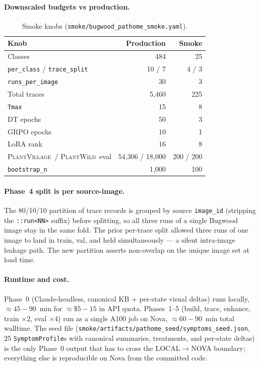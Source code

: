 \documentclass[11pt,twocolumn]{article}
\newcommand{\pv}{\textsc{PlantVillage}\xspace}
\newcommand{\pw}{\textsc{PlantWild}\xspace}
\begin{document}
\paragraph{Downscaled budgets vs production.}
\begin{table}[H]\centering\small
\begin{tabular}{l r r}
\toprule
\textbf{Knob} & \textbf{Production} & \textbf{Smoke} \\
\midrule
Classes & 484 & 25 \\
\texttt{per\_class} / \texttt{trace\_split} & 10 / 7 & 4 / 3 \\
\texttt{runs\_per\_image} & 30 & 3 \\
Total traces & 5{,}460 & 225 \\
\texttt{Tmax} & 15 & 8 \\
DT epochs & 50 & 3 \\
GRPO epochs & 10 & 1 \\
LoRA rank & 16 & 8 \\
\pv\ / \pw\ eval & 54{,}306 / 18{,}000 & 200 / 200 \\
\texttt{bootstrap\_n} & 1{,}000 & 100 \\
\bottomrule
\end{tabular}
\caption{Smoke knobs (\texttt{smoke/bugwood\_pathome\_smoke.yaml}).}
\label{tab:smoke-budgets}
\end{table}

\paragraph{Phase~4 split is per source-image.} The 80/10/10
partition of trace records is grouped by source
\texttt{image\_id} (stripping the \texttt{::run<NN>} suffix)
before splitting, so all three runs of a single Bugwood image
stay in the same fold. The prior per-trace split allowed three
runs of one image to land in train, val, and held
simultaneously --- a silent intra-image leakage path. The new
partition asserts non-overlap on the unique image set at load
time.

\paragraph{Runtime and cost.} Phase~0 (Claude-headless,
canonical KB + per-state visual deltas) runs locally,
${\approx}45{-}90$~min for ${\approx}\$5{-}15$ in API quota.
Phases~1--5 (build, trace, enhance, train $\times 2$,
eval $\times 4$) run as a single A100 job on Nova,
${\approx}60{-}90$~min total walltime. The seed file
(\texttt{smoke/artifacts/pathome\_seed/symptoms\_seed.json},
25 \texttt{SymptomProfile}s with canonical summaries,
treatments, and per-state deltas) is the only Phase~0 output
that has to cross the LOCAL${\to}$NOVA boundary; everything
else is reproducible on Nova from the committed code.
\end{document}
